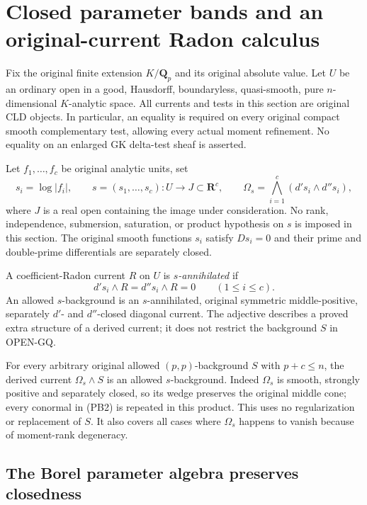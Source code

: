 \section{Closed parameter bands and an original-current Radon calculus}
\label{sec:r12-closed-parameter-bands}

Fix the original finite extension $K/\mathbf Q_p$ and its original
absolute value. Let $U$ be an ordinary open in a good, Hausdorff,
boundaryless, quasi-smooth, pure $n$-dimensional $K$-analytic space.
All currents and tests in this section are original CLD objects.
In particular, an equality is required on every original compact
smooth complementary test, allowing every actual moment refinement.
No equality on an enlarged GK delta-test sheaf is asserted.

Let $f_1,\ldots,f_c$ be original analytic units, set
\[
 s_i=\log|f_i|,\qquad s=(s_1,\ldots,s_c):U\longrightarrow J\subset\mathbf R^c,
 \qquad
 \Omega_s=\bigwedge_{i=1}^c(d's_i\wedge d''s_i),
 \tag{PB1}
\]
where $J$ is a real open containing the image under consideration.
No rank, independence, submersion, saturation, or product hypothesis
on $s$ is imposed in this section. The original smooth functions
$s_i$ satisfy $Ds_i=0$ and their prime and double-prime differentials
are separately closed.

\begin{definition}
\label{def:r12-parameter-annihilated}
A coefficient-Radon current $R$ on $U$ is \emph{$s$-annihilated} if
\[
                 d's_i\wedge R=d''s_i\wedge R=0
                         \qquad(1\le i\le c).
 \tag{PB2}
\]
An allowed $s$-background is an $s$-annihilated, original symmetric
middle-positive, separately $d'$- and $d''$-closed diagonal current.
The adjective describes a proved extra structure of a derived
current; it does not restrict the background $S$ in OPEN-GQ.
\end{definition}

For every arbitrary original allowed $(p,p)$-background $S$ with
$p+c\le n$, the derived current $\Omega_s\wedge S$ is an allowed
$s$-background. Indeed $\Omega_s$ is smooth, strongly positive and
separately closed, so its wedge preserves the original middle cone;
every conormal in (PB2) is repeated in this product. This uses no
regularization or replacement of $S$. It also covers all cases where
$\Omega_s$ happens to vanish because of moment-rank degeneracy.

\subsection{The Borel parameter algebra preserves closedness}

